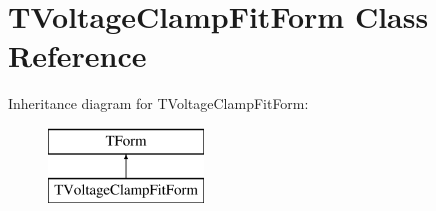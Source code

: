 \hypertarget{class_t_voltage_clamp_fit_form}{\section{T\+Voltage\+Clamp\+Fit\+Form Class Reference}
\label{class_t_voltage_clamp_fit_form}
}
Inheritance diagram for T\+Voltage\+Clamp\+Fit\+Form\+:\begin{figure}[H]
\begin{center}
\leavevmode
\includegraphics[height=2.000000cm]{class_t_voltage_clamp_fit_form}
\end{center}
\end{figure}

